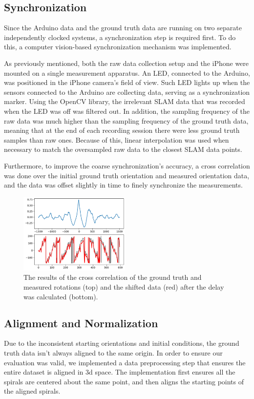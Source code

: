 \subsection{Synchronization}
Since the Arduino data and the ground truth data are running on two separate independently clocked systems, a synchronization step is required first. To do this, a computer vision-based synchronization mechanism was implemented. 
\par
As previously mentioned, both the raw data collection setup and the iPhone were mounted on a single measurement apparatus. An LED, connected to the Arduino, was positioned in the iPhone camera's field of view. Such LED lights up when the sensors connected to the Arduino are collecting data, serving as a synchronization marker. Using the OpenCV library, the irrelevant SLAM data that was recorded when the LED was off was filtered out. In addition, the sampling frequency of the raw data was much higher than the sampling frequency of the ground truth data, meaning that at the end of each recording session there were less ground truth samples than raw ones. Because of this, linear interpolation was used when necessary to match the oversampled raw data to the closest SLAM data points.

Furthermore, to improve the coarse synchronization's accuracy, a cross correlation was done over the initial ground truth orientation and measured orientation data, and the data was offset slightly in time to finely synchronize the measurements.
\begin{figure}[h] 
	\centering \includegraphics[height=4cm]{./images/crosscorrel.png}
	\caption{The results of the cross correlation of the ground truth and measured rotations (top) and the shifted data (red) after the delay was calculated (bottom).}
\end{figure}


\subsection{Alignment and Normalization}
Due to the inconsistent starting orientations and initial conditions, the ground truth data isn't always aligned to the same origin. In order to ensure our evaluation was valid, we implemented a data preprocessing step that ensures the entire dataset is aligned in 3d space. The implementation first ensures all the spirals are centered about the same point, and then aligns the starting points of the aligned spirals.

